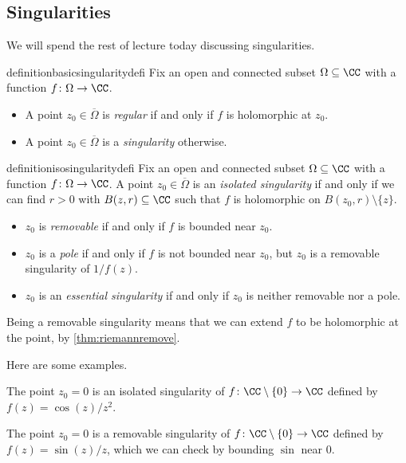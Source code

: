 \subsection{Singularities}
We will spend the rest of lecture today discussing singularities.
\begin{restatable}{definition}{basicsingularitydefi}
	Fix an open and connected subset $\Omega\subseteq\CC$ with a function $f\colon \Omega\to\CC$.
	\begin{itemize}
		\item A point $z_0\in\overline\Omega$ is \textit{regular} if and only if $f$ is holomorphic at $z_0$.
		\item A point $z_0\in\overline\Omega$ is a \textit{singularity} otherwise.
	\end{itemize}
\end{restatable}
\begin{restatable}{definition}{isosingularitydefi}   
	Fix an open and connected subset $\Omega\subseteq\CC$ with a function $f\colon \Omega\to\CC$. A point $z_0\in\overline\Omega$ is an \textit{isolated singularity} if and only if we can find $r>0$ with $B(z,r)\subseteq\CC$ such that $f$ is holomorphic on $B(z_0,r)\setminus\{z\}$.
	\begin{itemize}
		\item $z_0$ is \textit{removable} if and only if $f$ is bounded near $z_0$.
		\item $z_0$ is a \textit{pole} if and only if $f$ is not bounded near $z_0$, but $z_0$ is a removable singularity of $1/f(z)$.
		\item $z_0$ is an \textit{essential singularity} if and only if $z_0$ is neither removable nor a pole.
	\end{itemize}
\end{restatable}
\begin{remark}
	Being a removable singularity means that we can extend $f$ to be holomorphic at the point, by \autoref{thm:riemannremove}.
\end{remark}
Here are some examples.
\begin{example}
	The point $z_0=0$ is an isolated singularity of $f\colon \CC\setminus\{0\}\to\CC$ defined by $f(z)=\cos(z)/z^2$.
\end{example}
\begin{example}
	The point $z_0=0$ is a removable singularity of $f\colon \CC\setminus\{0\}\to\CC$ defined by $f(z)=\sin(z)/z$, which we can check by bounding $\sin$ near $0$.
\end{example}
